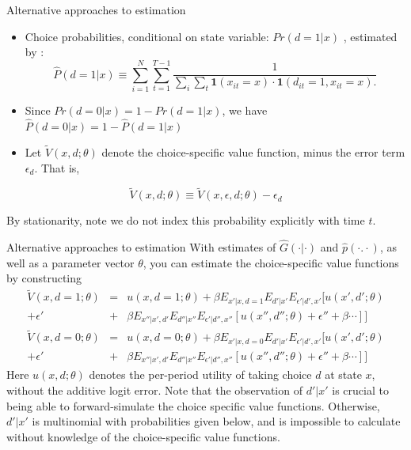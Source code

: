 \begin{frame}{Alternative approaches to estimation}
\begin{itemize}
\item Choice probabilities, conditional on state variable: $Pr(d = 1 | x)$  , estimated by :
\begin{equation*}
\hat P (d = 1| x) \equiv \sum^N_{i=1} \sum^{T-1}_{t=1} \frac{1}{\sum_i \sum_t \mathbf{1} (x_{it} = x ) \cdot \mathbf{1} (d_{it} =1, x_{it} = x).}
\end{equation*}
\item  Since  $Pr(d = 0 | x) = 1 - Pr(d=1 |x)$, we have $\hat{P} (d = 0 | x) = 1 - \hat{P}(d = 1|x)$
\item Let $\tilde V (x, d ; \theta)$ denote the choice-specific value function, minus the error term $\epsilon_d$. That is,
\end{itemize}
\begin{equation*}
\tilde V (x, d; \theta) \equiv \tilde V (x, \epsilon, d; \theta) - \epsilon_d
\end{equation*}
\begin{reference}{4mm}{90mm}
By stationarity, note we do not index this probability explicitly with time $t$.
\end{reference}
\end{frame}


\begin{frame}{Alternative approaches to estimation}
With estimates of $\hat G (\cdot | \cdot)$ and $\hat p (\cdot .  \cdot)$, as well as a parameter vector $\theta$, you can \alert{estimate} the choice-specific value functions by constructing  
\begin{eqnarray*}
\tilde V(x, d =1 ;\theta) &= & u(x, d=1; \theta) + \beta E_{x'|x, d=1} E_{d'|x'} E_{\epsilon '| d', x'} [ u(x', d' ;\theta)\\ 
+ \epsilon' &+&  \beta E_{x''|x', d'} E_{d''|x''} E_{\epsilon'|d'', x''} [ u(x'', d'';\theta) + \epsilon'' + \beta \cdots ] ] \\
\tilde V(x, d =0 ;\theta) &= & u(x, d=0; \theta) + \beta E_{x'|x, d=0} E_{d'|x'} E_{\epsilon '| d', x'} [ u(x', d' ;\theta)  \\
+ \epsilon' &+& \beta E_{x''|x', d'} E_{d''|x''} E_{\epsilon'|d'', x''} [ u(x'', d'';\theta) + \epsilon'' + \beta \cdots ] ]
\end{eqnarray*}
Here $u(x, d;\theta)$ denotes the per-period utility of taking choice $d$ at state $x$, \alert{without} the additive logit error. Note that the observation of $d'|x'$ is crucial to being able to forward-simulate the \alert{choice specific value functions}. Otherwise, $d'|x'$ is multinomial with probabilities given below, and is impossible to calculate without knowledge of the choice-specific value functions. 
\end{frame}


